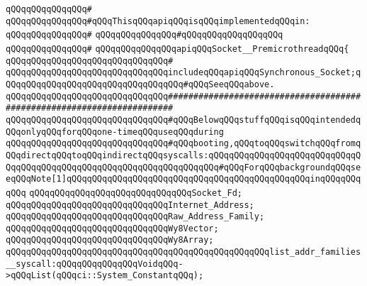 \verb|qQQqqQQqqQQqqQQq#|\newline
\verb|qQQqqQQqqQQqqQQq#qQQqThisqQQqapiqQQqisqQQqimplementedqQQqin:|\newline
\verb|qQQqqQQqqQQqqQQq#|\newline
\verb|qQQqqQQqqQQqqQQq#qQQqqQQqqQQqqQQqqQQq|\newline
\verb|qQQqqQQqqQQqqQQq#|\newline
\verb|qQQqqQQqqQQqqQQqapiqQQqSocket__PremicrothreadqQQq{|\newline
\verb|qQQqqQQqqQQqqQQqqQQqqQQqqQQqqQQq#|\newline
\verb|qQQqqQQqqQQqqQQqqQQqqQQqqQQqqQQqincludeqQQqapiqQQqSynchronous_Socket;qQQqqQQqqQQqqQQqqQQqqQQqqQQqqQQqqQQq#qQQqSeeqQQqabove.|\newline
\newline
\newline
\newline
\verb|qQQqqQQqqQQqqQQqqQQqqQQqqQQqqQQq#######################################################################|\newline
\verb|qQQqqQQqqQQqqQQqqQQqqQQqqQQqqQQq#qQQqBelowqQQqstuffqQQqisqQQqintendedqQQqonlyqQQqforqQQqone-timeqQQquseqQQqduring|\newline
\verb|qQQqqQQqqQQqqQQqqQQqqQQqqQQqqQQq#qQQqbooting,qQQqtoqQQqswitchqQQqfromqQQqdirectqQQqtoqQQqindirectqQQqsyscalls:qQQqqQQqqQQqqQQqqQQqqQQqqQQqqQQqqQQqqQQqqQQqqQQqqQQqqQQqqQQqqQQqqQQqqQQq#qQQqForqQQqbackgroundqQQqseeqQQqNote[1]qQQqqQQqqQQqqQQqqQQqqQQqqQQqqQQqqQQqqQQqqQQqqQQqinqQQqqQQqqQQq|\newline
\newline
\verb|qQQqqQQqqQQqqQQqqQQqqQQqqQQqqQQqSocket_Fd;|\newline
\verb|qQQqqQQqqQQqqQQqqQQqqQQqqQQqqQQqInternet_Address;|\newline
\verb|qQQqqQQqqQQqqQQqqQQqqQQqqQQqqQQqRaw_Address_Family;|\newline
\verb|qQQqqQQqqQQqqQQqqQQqqQQqqQQqqQQqWy8Vector;|\newline
\verb|qQQqqQQqqQQqqQQqqQQqqQQqqQQqqQQqWy8Array;|\newline
\newline
\verb|qQQqqQQqqQQqqQQqqQQqqQQqqQQqqQQqqQQqqQQqqQQqqQQqqQQqlist_addr_families__syscall:qQQqqQQqqQQqqQQqVoidqQQq->qQQqList(qQQqci::System_ConstantqQQq);|\newline

